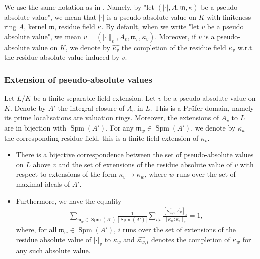 \documentclass [11pt,reqno]{amsart}
\newcommand{\1}{\mathmybb{1}}
\def\m{\mathfrak m}
\def\Spm{\operatorname{Spm}}
\newcommand{\va}{|\cdot|}
\begin{document}
We use the same notation as in \cite{Sedillot_pav}. Namely, by "let $(\va,A,\m,\kappa)$ be a pseudo-absolute value", we mean that $\va$ is a pseudo-absolute value on $K$ with finiteness ring $A$, kernel $\m$, residue field $\kappa$. By default, when we write "let $v$ be a pseudo absolute value", we mean $v=(|\cdot\|_{v},A_v,\m_v,\kappa_v)$. Moreover, if $v$ is a pseudo-absolute value on $K$, we denote by $\widehat{\kappa_v}$ the completion of the residue field $\kappa_v$ w.r.t. the residue absolute value induced by $v$.

\subsubsection{Extension of pseudo-absolute values}

Let $L/K$ be a finite separable field extension. Let $v$ be a pseudo-absolute value on $K$. Denote by $A'$ the integral closure of $A_v$ in $L$. This is a Prüfer domain, namely its prime localisations are valuation rings. Moreover, the extensions of $A_v$ to $L$ are in bijection with $\Spm(A')$. For any $\m_{w}\in\Spm(A')$, we denote by $\kappa_{w}$ the corresponding residue field, this is a finite field extension of $\kappa_{v}$.

\begin{proposition}
\label{prop:formula_extension_sav}
\begin{itemize}
	\item[(1)] There is a bijective correspondence between the set of pseudo-absolute values on $L$ above $v$ and the set of extensions of the residue absolute value of $v$ with respect to extensions of the form $\kappa_v\to\kappa_w$, where $w$ runs over the set of maximal ideals of $A'$.
	\item[(2)] Furthermore, we have the equality
\begin{align}
\label{eq:formula_extension_sav}
\displaystyle\sum_{\m_w\in \Spm(A')} \frac{1}{|\Spm(A')|} \sum_{i | v} \frac{[\widehat{\kappa_{w,i}}:\widehat{\kappa_v}]_s}{[\kappa_w:\kappa_v]_s} = 1,
\end{align}
where, for all $\m_w\in \Spm(A')$, $i$ runs over the set of extensions of the residue absolute value of $\va_v$ to $\kappa_w$ and $\widehat{\kappa_{w,i}}$ denotes the completion of $\kappa_w$ for any such absolute value. 
\end{itemize}

\end{proposition}
\end{document}
